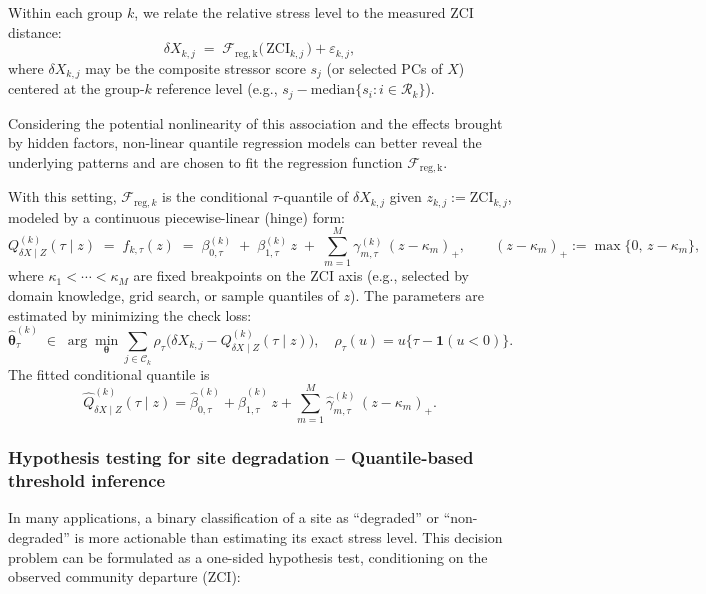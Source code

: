 Within each group \(k\), we relate the relative stress level to the measured $\mathrm{ZCI}$ distance:
\[
\delta X_{k,j} \;=\; \mathcal{F}_{\mathrm{reg, k}}\!\big(\,\mathrm{ZCI}_{k,j}\,\big) + \varepsilon_{k,j},
\]
where $\delta X_{k,j}$ may be the composite stressor score $s_j$ (or selected PCs of $X$) centered at the group-$k$ reference level (e.g., $s_j-\mathrm{median}\{s_i:i\in\mathcal{R}_k\}$).

Considering the potential nonlinearity of this association and the effects brought by hidden factors, 
non-linear quantile regression models can better reveal the underlying patterns and are chosen to fit the regression function $\mathcal{F}_{\mathrm{reg, k}}$.

With this setting, $\mathcal{F}_{\mathrm{reg},k}$ is the conditional $\tau$-quantile of $\delta X_{k,j}$ given $z_{k,j}:=\mathrm{ZCI}_{k,j}$, modeled by a continuous piecewise-linear (hinge) form:
\[
Q_{\delta X\mid Z}^{(k)}(\tau \mid z)
\;=\;
f_{k,\tau}(z)
\;=\;
\beta_{0,\tau}^{(k)} 
\;+\;
\beta_{1,\tau}^{(k)}\,z
\;+\;
\sum_{m=1}^{M}\gamma_{m,\tau}^{(k)}\, (z-\kappa_m)_+,
\qquad
(z-\kappa_m)_+ := \max\{0,\,z-\kappa_m\},
\]
where $\kappa_1<\cdots<\kappa_M$ are fixed breakpoints on the $\mathrm{ZCI}$ axis (e.g., selected by domain knowledge, grid search, or sample quantiles of $z$). The parameters are estimated by minimizing the check loss:
\[
\widehat{\boldsymbol{\theta}}_{\tau}^{(k)}
\;\in\;
\arg\min_{\boldsymbol{\theta}}
\sum_{j\in\mathcal{C}_k}
\rho_{\tau}\!\Big(
\delta X_{k,j}-Q_{\delta X\mid Z}^{(k)}(\tau \mid z)
\Big),
\quad
\rho_{\tau}(u)=u\{\tau-\mathbf{1}(u<0)\}.
\]
The fitted conditional quantile is
\[
\widehat{Q}_{\delta X\mid Z}^{(k)}(\tau \mid z)
=
\widehat{\beta}_{0,\tau}^{(k)} 
+
\widehat{\beta}_{1,\tau}^{(k)}\,z
+
\sum_{m=1}^{M}\widehat{\gamma}_{m,\tau}^{(k)}\, (z-\kappa_m)_+.
\]

\subsubsection{Hypothesis testing for site degradation -- Quantile-based threshold inference}

In many applications, a binary classification of a site as ``degraded'' or ``non-degraded'' 
is more actionable than estimating its exact stress level. 
This decision problem can be formulated as a one-sided hypothesis test, conditioning on the 
observed community departure (ZCI):


